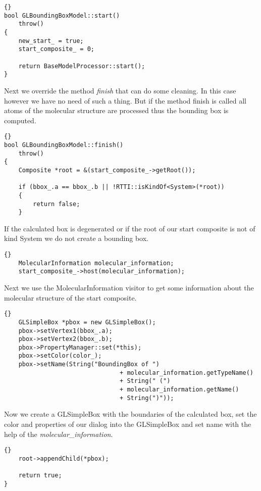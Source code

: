\begin{lstlisting}{}
bool GLBoundingBoxModel::start()
	throw()
{
	new_start_ = true;
	start_composite_ = 0;

	return BaseModelProcessor::start();
}
\end{lstlisting}

Next we override the method {\em finish} that can do some cleaning. In this case
however we have no need of such a thing. But if the method finish is called
all atoms of the molecular structure are processed thus the bounding box is computed.

\begin{lstlisting}{}
bool GLBoundingBoxModel::finish()
	throw()
{
	Composite *root = &(start_composite_->getRoot());

	if (bbox_.a == bbox_.b || !RTTI::isKindOf<System>(*root))
	{
		return false;
	}
\end{lstlisting}

If the calculated box is degenerated or if the root of our start composite is
not of kind System we do not create a bounding box.

\begin{lstlisting}{}
	MolecularInformation molecular_information;
	start_composite_->host(molecular_information);                        
\end{lstlisting}

Next we use the MolecularInformation visitor to get some information about the
molecular structure of the start composite.

\begin{lstlisting}{}
	GLSimpleBox *pbox = new GLSimpleBox();
	pbox->setVertex1(bbox_.a);
	pbox->setVertex2(bbox_.b);
	pbox->PropertyManager::set(*this);
	pbox->setColor(color_);
	pbox->setName(String("BoundingBox of ")
								+ molecular_information.getTypeName()
								+ String(" (")
								+ molecular_information.getName()
								+ String(")"));
\end{lstlisting}

Now we create a GLSimpleBox with the boundaries of the calculated box, set the
color and properties of our dialog into the GLSimpleBox and set name with the help
of the {\em molecular\_information}.
																										 
\begin{lstlisting}{}
	root->appendChild(*pbox);

	return true;
}
\end{lstlisting}

